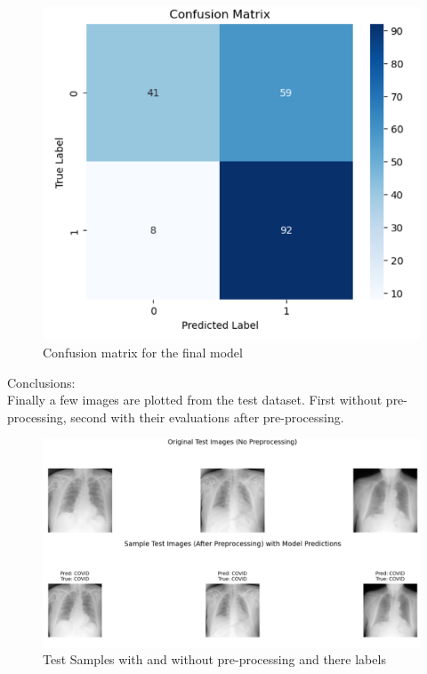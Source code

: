 \documentclass[conference]{IEEEtran}
\begin{document}
\begin{figure}[htbp]
	\centerline{\includegraphics[width=\linewidth]{Images/Transferlearning_3.png}}
	\caption{Confusion matrix for the final model}
	\label{fig:baseline_curves}
\end{figure}

Conclusions:\\


Finally a few images are plotted from the test dataset. First without pre-processing, second with their evaluations after pre-processing.\\	

\begin{figure}[htbp]
	\centerline{\includegraphics[width=\linewidth]{Images/Transferlearning_4.png}}
	\caption{Test Samples with and without pre-processing and there labels}
	\label{fig:baseline_curves}
\end{figure}
\end{document}
